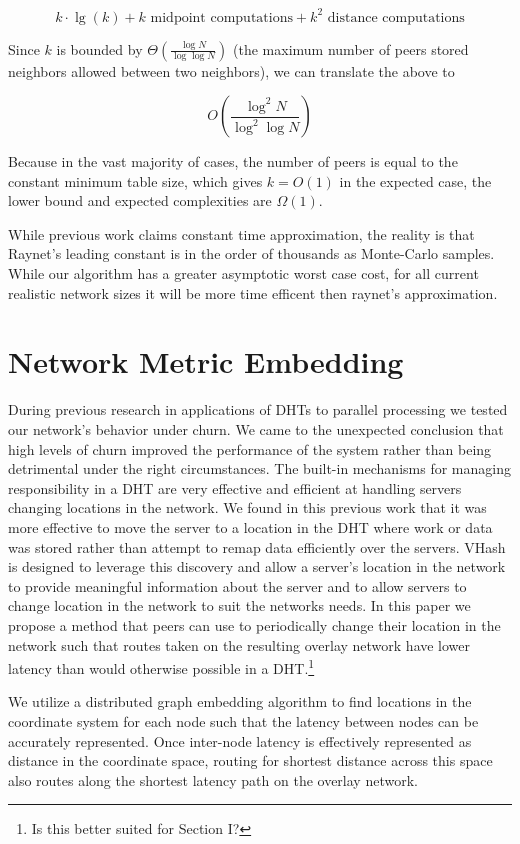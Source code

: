 \documentclass{IEEEtran}
\begin{document}
\[ k\cdot\lg(k) + k \text{ midpoint computations}  + k^{2} \text{ distance computations} \]


Since  $k$ is  bounded by $\Theta(\frac{\log N}{\log \log N} )$ \cite{bern1991expected} (the maximum number of peers stored neighbors allowed between two neighbors), we can translate the above to

\[O(\frac{\log^{2} N}{\log^{2} \log N} )\]

Because in the vast majority of cases, the number of peers is equal to the constant minimum table size, which gives $k=O(1)$ in the expected case, the lower bound and expected complexities  are $\Omega{}(1)$.

While previous work \cite{raynet} claims constant time approximation, the reality is that Raynet's leading constant is in the order of thousands as Monte-Carlo samples.  
While our algorithm has a greater asymptotic worst case cost, for all current realistic network sizes it will be more time efficent then raynet's approximation.



\section{Network Metric Embedding}
During previous research in applications of DHTs to parallel processing \cite{andrew-poster} we tested our network's behavior under churn.
We came to the unexpected conclusion that high levels of churn improved the performance of the system rather than being detrimental under the right circumstances.
The built-in mechanisms for managing responsibility in a DHT are very effective and efficient at handling servers changing locations in the network.
We found in this previous work that it was more effective to move the server to a location in the DHT where work or data was stored rather than attempt to remap data efficiently over the servers.
VHash is designed to leverage this discovery and allow a server's location in the network to provide meaningful information about the server and to allow servers to change location in the network to suit the networks needs.
In this paper we propose a method that peers can use to periodically change their location in the network such that routes taken on the resulting overlay network have lower latency than would otherwise possible in a DHT.\footnote{Is this better suited for Section I?}

We utilize a distributed graph embedding algorithm to find locations in the coordinate system for each node such that the latency between nodes can be accurately represented.
Once inter-node latency is effectively represented as distance in the coordinate space, routing for shortest distance across this space also routes along the shortest latency path on the overlay network.
\end{document}
